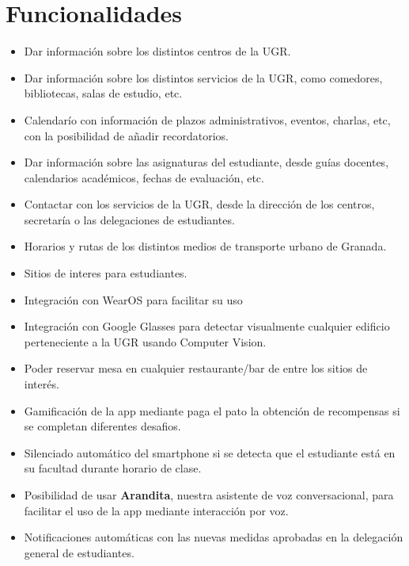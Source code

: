 \section{Funcionalidades}

\begin{itemize}
	\item Dar información sobre los distintos centros de la UGR.
	\item Dar información sobre los distintos servicios de la UGR, como comedores, bibliotecas, salas de estudio, etc.
	\item Calendarío con información de plazos administrativos, eventos, charlas, etc, con la posibilidad de añadir recordatorios.
	\item Dar información sobre las asignaturas del estudiante, desde guías docentes, calendarios académicos, fechas de evaluación, etc.
	\item Contactar con los servicios de la UGR, desde la dirección de los centros, secretaría o las delegaciones de estudiantes.
	\item Horarios y rutas de los distintos medios de transporte urbano de Granada.
	\item Sitios de interes para estudiantes.
	\item Integración con WearOS para facilitar su uso
	\item Integración con Google Glasses para detectar visualmente cualquier edificio perteneciente a la UGR usando Computer Vision.
	\item Poder reservar mesa en cualquier restaurante/bar de entre los sitios de interés.
	\item Gamificación de la app mediante paga el pato la obtención de recompensas si se completan diferentes desafios.
	\item Silenciado automático del smartphone si se detecta que el estudiante está en su facultad durante horario de clase.
	\item Posibilidad de usar \textbf{Arandita}, nuestra asistente de voz conversacional, para facilitar el uso de la app mediante interacción por voz.
	\item Notificaciones automáticas con las nuevas medidas aprobadas en la delegación general de estudiantes.
	
\end{itemize}

